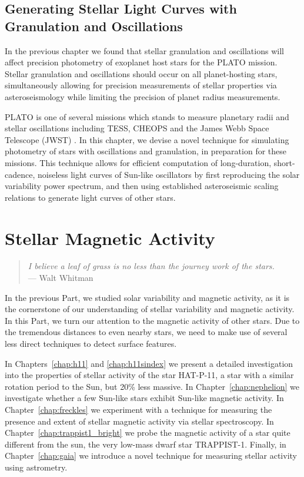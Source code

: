 \documentclass[12pt, twoside]{uwthesis}
\begin{document}
\chapter{Generating Stellar Light Curves with Granulation and Oscillations} \label{chap:astero}

In the previous chapter we found that stellar granulation and oscillations will affect precision photometry of exoplanet host stars for the PLATO mission. Stellar granulation and oscillations should occur on all planet-hosting stars, simultaneously allowing for precision measurements of stellar properties via asteroseismology while limiting the precision of planet radius measurements. 

PLATO is one of several missions which stands to measure planetary radii and stellar oscillations including TESS, CHEOPS and the James Webb Space Telescope (JWST) \citep{Ricker2014,Broeg2013,Beichman2014}. In this chapter, we devise a novel technique for simulating photometry of stars with oscillations and granulation, in preparation for these missions. This technique allows for efficient computation of long-duration, short-cadence, noiseless light curves of Sun-like oscillators by first reproducing the solar variability power spectrum, and then using established asteroseismic scaling relations to generate light curves of other stars. 

\part{Stellar Magnetic Activity} \label{part:activity}

\begin{verse}
{\it I believe a leaf of grass is no less than the journey work of the stars.\\}
\hfill --- Walt Whitman
\end{verse}

In the previous Part, we studied solar variability and magnetic activity, as it is the cornerstone of our understanding of stellar variability and magnetic activity. In this Part, we turn our attention to the magnetic activity of other stars. Due to the tremendous distances to even nearby stars, we need to make use of several less direct techniques to detect surface features. 

In Chapters~\ref{chap:h11} and \ref{chap:h11sindex} we present a detailed investigation into the properties of stellar activity of the star HAT-P-11, a star with a similar rotation period to the Sun, but 20\% less massive. In Chapter~\ref{chap:nephelion} we investigate whether a few Sun-like stars exhibit Sun-like magnetic activity. In Chapter~\ref{chap:freckles} we experiment with a technique for measuring the presence and extent of stellar magnetic activity via stellar spectroscopy. In Chapter~\ref{chap:trappist1_bright} we probe the magnetic activity of a star quite different from the sun, the very low-mass dwarf star TRAPPIST-1. Finally, in Chapter~\ref{chap:gaia} we introduce a novel technique for measuring stellar activity using astrometry. 
\end{document}
